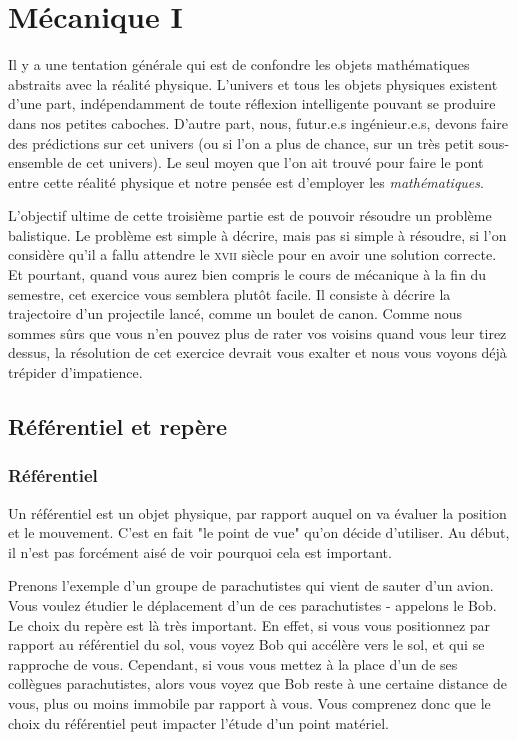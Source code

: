 \documentclass{article}
\begin{document}
\newpage
\section{Mécanique I}

Il y a une tentation générale qui est de confondre les objets mathématiques abstraits avec la réalité physique. L'univers et tous les objets physiques existent d'une part, indépendamment de toute réflexion intelligente pouvant se produire dans nos petites caboches. D'autre part, nous, futur.e.s ingénieur.e.s, devons faire des prédictions sur cet univers (ou si l'on a plus de chance, sur un très petit sous-ensemble de cet univers). Le seul moyen que l'on ait trouvé pour faire le pont entre cette réalité physique et notre pensée est d'employer les \emph{mathématiques}. %

L'objectif ultime de cette troisième partie est de pouvoir résoudre un problème balistique. Le problème est simple à décrire, mais pas si simple à résoudre, si l'on considère qu'il a fallu attendre le \textsc{xvii}\ieme{} siècle pour en avoir une solution correcte. Et pourtant, quand vous aurez bien compris le cours de mécanique à la fin du semestre, cet exercice vous semblera plutôt facile. Il consiste à décrire la trajectoire d'un projectile lancé, comme un boulet de canon. Comme nous sommes sûrs que vous n'en pouvez plus de rater vos voisins quand vous leur tirez dessus, la résolution de cet exercice devrait vous exalter et nous vous voyons déjà trépider d'impatience.


\subsection{Référentiel et repère}

\subsubsection{Référentiel}

Un référentiel est un objet physique, par rapport auquel on va évaluer la position et le mouvement. C'est en fait "le point de vue" qu'on décide d'utiliser. Au début, il n'est pas forcément aisé de voir pourquoi cela est important.

Prenons l'exemple d'un groupe de parachutistes qui vient de sauter d'un avion. Vous voulez étudier le déplacement d'un de ces parachutistes - appelons le Bob. Le choix du repère est là très important. En effet, si vous vous positionnez par rapport au référentiel du sol, vous voyez Bob qui accélère vers le sol, et qui se rapproche de vous. Cependant, si vous vous mettez à la place d'un de ses collègues parachutistes, alors vous voyez que Bob reste à une certaine distance de vous, plus ou moins immobile par rapport à vous. Vous comprenez donc que le choix du référentiel peut impacter l'étude d'un point matériel.
\end{document}
